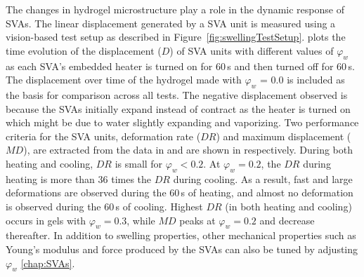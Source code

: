 The changes in hydrogel microstructure play a role in the dynamic response of SVAs. The linear displacement generated by a SVA unit
is measured using a vision-based test setup as described in Figure~\ref{fig:swellingTestSetup}.  plots the time evolution of the displacement ($D$) of SVA units with different values of $\varphi_w$ 
as each SVA's embedded heater is turned on for 60\,s 
and then turned off for 60\,s. The displacement over time of the hydrogel made with \(\varphi_{w}\) = 0.0 is included as the basis for comparison across all tests. The negative displacement observed is because the SVAs initially expand instead of contract as the heater is turned on which might be due to water slightly expanding and vaporizing. Two performance criteria for the SVA units, deformation rate ($DR$) and maximum displacement ($MD$), are extracted from the data in  and are shown in  respectively. During both heating and cooling, $DR$ is small for \(\varphi_{w} < 0.2\). At \(\varphi_{w} = 0.2\), the $DR$ during heating is more than 36 times the $DR$ during cooling. As a result, fast and large deformations are observed during the 60\,s of heating, and almost no deformation is observed during the 60\,s of cooling. 
Highest $DR$ (in both heating and cooling) occurs in gels with $\varphi_w = 0.3$, while $MD$ peaks at $\varphi_w = 0.2$ and decrease thereafter.
In addition to swelling properties, other mechanical properties such as Young's modulus and force produced by the SVAs can also be tuned by adjusting \(\varphi_{w}\) \ref{chap:SVAs}.\\ 
